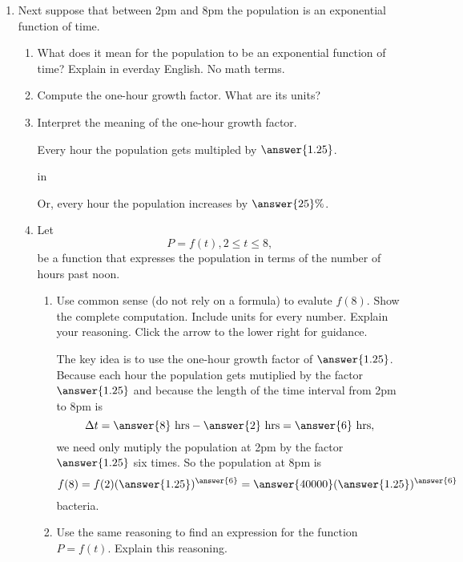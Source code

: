 \documentclass{ximera}
\newcommand{\pskip}{\vskip 0.1 in}
\begin{document}
\begin{example}
\begin{enumerate}
\begin{enumerate}
\end{enumerate}

\item Next suppose that between 2pm and 8pm the population is an exponential function of time.

\begin{enumerate}
\item What does it mean for the population to be an exponential function of time? Explain in everday English. No math terms.

\item Compute the one-hour growth factor. What are its units?%

\item Interpret the meaning of the one-hour growth factor.

Every hour the population gets multipled by $\answer{1.25}$.

\pskip

Or, every hour the population increases by $\answer{25}\%$.


\item Let 
\[
      P = f(t) , 2\leq t \leq 8 ,
\]
be a function that expresses the population in terms of the number of hours past noon.

\begin{enumerate}
\item Use common sense (do not rely on a formula) to evalute $f(8)$. Show the complete computation. Include units for every number. Explain your reasoning. Click the arrow to the lower right for guidance.
\begin{expandable}
The key idea is to use the one-hour growth factor of $\answer{1.25}$. Because each hour the population gets mutiplied by the factor $\answer{1.25}$ and because the length of the time interval from 2pm to 8pm is
\[
   \Delta t = \answer{8} \text{ hrs} - \answer{2}\text{ hrs} = \answer{6} \text{ hrs} , 
\] 
we need only mutiply the population at 2pm by the factor $\answer{1.25}$ six times. So the population at 8pm is
\[
   f(8) = f(2) (\answer{1.25})^{\answer{6}} = \answer{40000} (\answer{1.25})^{\answer{6}} 
\]
bacteria.
 
\end{expandable}

\item Use the same reasoning to find an expression for the function $P=f(t)$. Explain this reasoning.
\end{enumerate}
\end{enumerate}

\end{enumerate}

\end{example}
\end{document}
